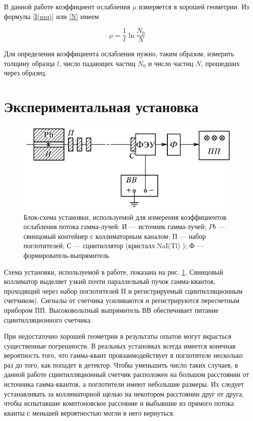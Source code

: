 \documentclass[a4paper,12pt]{article} %
\begin{document}
	\medskip
	
\noindent В данной работе коэффициент ослабления $ \mu $ измеряется в хорошей
	геометрии. Из формулы \eqref{I(mu)} или \eqref{N} имеем
	
	\begin{equation}\label{mu}
	\mu = \dfrac{1}{l} \ln{\dfrac{N_0}{N}}
	\end{equation}
	
\noindent Для определения коэффициента ослабления нужно, таким образом, измерить толщину образца $ l $, число падающих частиц $ N_0 $ и число
	частиц $ N $, прошедших через образец.
	
	\section{Экспериментальная установка}
	
		\begin{figure}[h!]
		\centering
		\includegraphics[width=0.7\linewidth]{lab}
		\caption{Блок-схема установки, используемой для измерения коэффициентов ослабления потока гамма-лучей: И --- источник гамма-лучей; $ Pb $ --- свинцовый контейнер с коллиматорным каналом; П --- набор поглотителей; С --- сцинтиллятор (кристалл
			NaI(Tl) ); Ф --- формирователь-выпрямитель}
		\label{ris lab}
	\end{figure}

\noindent Схема установки, используемой в работе, показана на рис. \ref{ris lab}. Свинцовый коллиматор выделяет узкий почти параллельный пучок гамма-квантов, проходящий через набор поглотителей П и регистрируемый сцинтилляционным счетчиком). Сигналы от счетчика усиливаются и регистрируются пересчетным прибором ПП. Высоковольтный выпрямитель ВВ обеспечивает питание сцинтилляционного счетчика.

\medskip

\noindent При недостаточно хорошей геометрии в результаты опытов могут
вкрасться существенные погрешности. В реальных установках всегда имеется конечная вероятность того, что гамма-квант провзаимодействует в
поглотителе несколько раз до того, как попадет в детектор. Чтобы уменьшить число таких случаев, в данной работе сцинтилляционный счетчик расположен на большом расстоянии от источника гамма-квантов, а поглотители имеют небольшие
размеры. Их следует устанавливать за коллиматорной щелью на некотором расстоянии друг от друга, чтобы испытавшие комптоновское
рассеяние и выбывшие из прямого потока кванты с меньшей вероятностью могли в него вернуться.
\end{document}
